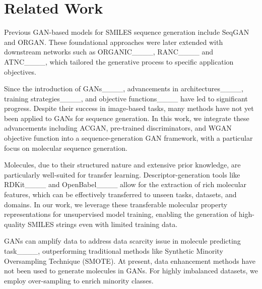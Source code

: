 \section{Related Work}
Previous GAN-based models for SMILES sequence generation include SeqGAN and ORGAN. These foundational approaches were later extended with downstream networks such as ORGANIC____, RANC____ and ATNC____, which tailored the generative process to specific application objectives. %

Since the introduction of GANs____, advancements in architectures____, training strategies____, and objective functions____ have led to significant progress. Despite their success in image-based tasks, many methods have not yet been applied to GANs for sequence generation. In this work, we integrate these advancements including ACGAN, pre-trained discriminators, and WGAN objective function into a sequence-generation GAN framework, with a particular focus on molecular sequence generation.%

Molecules, due to their structured nature and extensive prior knowledge, are particularly well-suited for transfer learning. Descriptor-generation tools like RDKit____ and OpenBabel____ allow for the extraction of rich molecular features, which can be effectively transferred to unseen tasks, datasets, and domains. In our work, we leverage these transferable molecular property representations for unsupervised model training, enabling the generation of high-quality SMILES strings even with limited training data.

GANs can amplify data to address data scarcity issue in molecule predicting task____, outperforming traditional methods like Synthetic Minority Oversampling Technique (SMOTE). At present, data enhancement methods have not been used to generate molecules in GANs. For highly imbalanced datasets, we employ over-sampling to enrich minority classes.